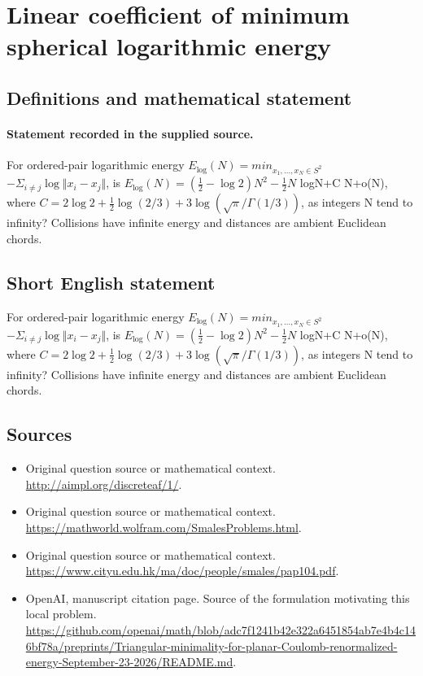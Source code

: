 \documentclass[11pt]{article}
\begin{document}
\section*{Linear coefficient of minimum spherical logarithmic energy}\label{statement}
\subsection{Definitions and mathematical statement}
\paragraph{Statement recorded in the supplied source.}
For ordered-pair logarithmic energy $E_{\log} (N)=min_{x_{1},\dots ,x_N\in S^{2}}$ $-\Sigma _{i\neq j}\log \Vert x_i-x_j\Vert $, is $E_{\log} (N)=(\tfrac12 -\log 2)N^{2}-\tfrac12 N$ logN+C N+o(N), where $C=2\log 2+\tfrac12 \log (2/3)+3\log (\surd \pi /\Gamma (1/3))$, as integers N tend to infinity? Collisions have infinite energy and distances are ambient Euclidean chords.
\subsection{Short English statement}
For ordered-pair logarithmic energy $E_{\log} (N)=min_{x_{1},\dots ,x_N\in S^{2}}$ $-\Sigma _{i\neq j}\log \Vert x_i-x_j\Vert $, is $E_{\log} (N)=(\tfrac12 -\log 2)N^{2}-\tfrac12 N$ logN+C N+o(N), where $C=2\log 2+\tfrac12 \log (2/3)+3\log (\surd \pi /\Gamma (1/3))$, as integers N tend to infinity? Collisions have infinite energy and distances are ambient Euclidean chords.
\subsection{Sources}
\begin{itemize}
\item[S1] Original question source or mathematical context.
\url{http://aimpl.org/discreteaf/1/}.
\item[S2] Original question source or mathematical context.
\url{https://mathworld.wolfram.com/SmalesProblems.html}.
\item[S3] Original question source or mathematical context.
\url{https://www.cityu.edu.hk/ma/doc/people/smales/pap104.pdf}.
\item[S4] OpenAI, manuscript citation page. Source of the formulation motivating this local problem.
\url{https://github.com/openai/math/blob/adc7f1241b42e322a6451854ab7e4b4c146bf78a/preprints/Triangular-minimality-for-planar-Coulomb-renormalized-energy-September-23-2026/README.md}.
\end{itemize}
\end{document}
